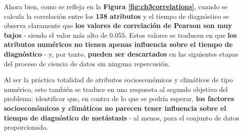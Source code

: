 Ahora bien, como se refleja en la \textbf{Figura \ref{fig:ch3correlations}}, cuando se calcula la correlación entre los \textbf{138 atributos} y el tiempo de diagnóstico se observa claramente que \textbf{los valores de correlación de Pearson son muy bajos} - siendo el valor más alto de $0.055$. Estos valores se traducen en que \textbf{los atributos numéricos no tienen apenas influencia sobre el tiempo de diagnóstico} - y, por tanto, \textbf{pueden ser descartados} en las siguientes etapas del proceso de ciencia de datos sin ninguna repercusión.

Al ser la práctica totalidad de atributos socioeconómicos y climáticos de tipo numérico, esto también se traduce en una respuesta al segundo objetivo del problema: identificar que, en contra de lo que se podría esperar, \textbf{los factores socioeconómicos y climáticos no parecen tener influencia sobre el tiempo de diagnóstico de metástasis} - al menos, para el conjunto de datos proporcionado.